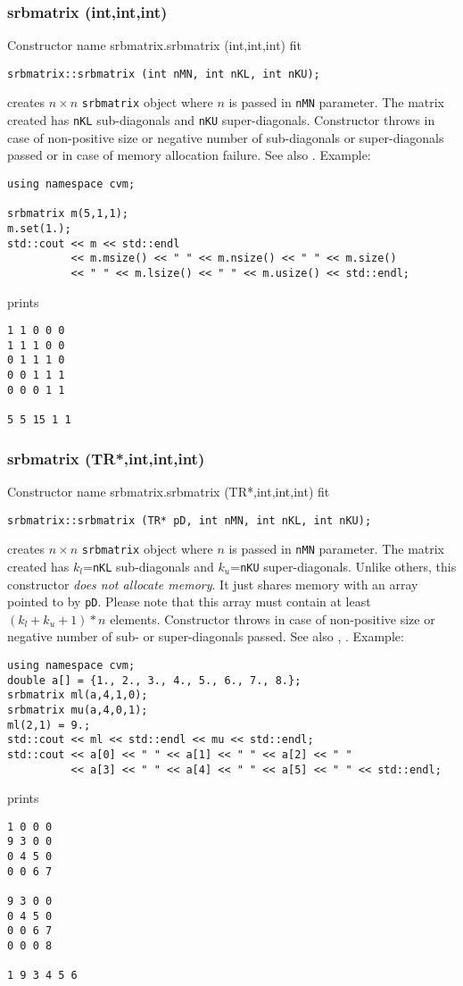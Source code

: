 \subsubsection{srbmatrix (int,int,int)}
Constructor%
\pdfdest name {srbmatrix.srbmatrix (int,int,int)} fit
\begin{verbatim}
srbmatrix::srbmatrix (int nMN, int nKL, int nKU);
\end{verbatim}
creates $n\times n$ \verb"srbmatrix" object where $n$ is passed in
\verb"nMN" parameter. The matrix created has \verb"nKL" 
sub-diagonals and \verb"nKU" super-diagonals.
Constructor throws  
in case of non-positive size or negative number 
of sub-diagonals or super-diagonals
passed or in case of memory allocation failure.
See also .
Example:
\begin{Verbatim}
using namespace cvm;

srbmatrix m(5,1,1);
m.set(1.);
std::cout << m << std::endl
          << m.msize() << " " << m.nsize() << " " << m.size()
          << " " << m.lsize() << " " << m.usize() << std::endl;
\end{Verbatim}
prints
\begin{Verbatim}
1 1 0 0 0
1 1 1 0 0
0 1 1 1 0
0 0 1 1 1
0 0 0 1 1

5 5 15 1 1
\end{Verbatim}
\newpage




\subsubsection{srbmatrix (TR*,int,int,int)}
Constructor%
\pdfdest name {srbmatrix.srbmatrix (TR*,int,int,int)} fit
\begin{verbatim}
srbmatrix::srbmatrix (TR* pD, int nMN, int nKL, int nKU);
\end{verbatim}
creates  $n\times n$ \verb"srbmatrix" object where $n$ is passed in
\verb"nMN" parameter. The matrix created has $k_l$=\verb"nKL" 
sub-diagonals and $k_u$=\verb"nKU" super-diagonals.
Unlike others, this constructor \textit{does not allocate  memory}.
It just shares  memory with an array pointed to by \verb"pD".
Please note that this array must contain at least $(k_l + k_u + 1)*n$ elements.
Constructor throws  
in case of non-positive size or negative number of sub- or super-diagonals 
passed.
See also ,
.
Example:
\begin{Verbatim}
using namespace cvm;
double a[] = {1., 2., 3., 4., 5., 6., 7., 8.};
srbmatrix ml(a,4,1,0);
srbmatrix mu(a,4,0,1);
ml(2,1) = 9.;
std::cout << ml << std::endl << mu << std::endl;
std::cout << a[0] << " " << a[1] << " " << a[2] << " "
          << a[3] << " " << a[4] << " " << a[5] << " " << std::endl;
\end{Verbatim}
prints
\begin{Verbatim}
1 0 0 0
9 3 0 0
0 4 5 0
0 0 6 7

9 3 0 0
0 4 5 0
0 0 6 7
0 0 0 8

1 9 3 4 5 6
\end{Verbatim}
\newpage


